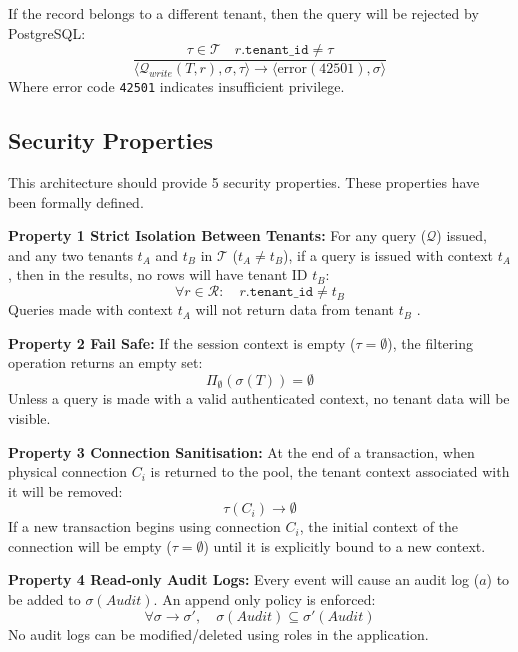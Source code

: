 \documentclass[conference]{IEEEtran}
\begin{document}
If the record belongs to a different tenant, then the query will be rejected by PostgreSQL:
\begin{equation}
\frac{\tau \in \mathcal{T} \quad r.\texttt{tenant\_id} \neq \tau}{\langle \mathcal{Q}_{\mathit{write}}(T, r), \sigma, \tau \rangle \to \langle \text{error}(42501), \sigma \rangle}
\end{equation}
Where error code \texttt{42501} indicates insufficient privilege.

\subsection{Security Properties}
This architecture should provide 5 security properties. These properties have been formally defined.

\noindent \textbf{Property 1 Strict Isolation Between Tenants:} For any query ($\mathcal{Q}$) issued, and any two tenants $t_A$ and $t_B$ in $\mathcal{T}$ ($t_A \neq t_B$), if a query is issued with context $t_A$, then in the results, no rows will have tenant ID $t_B$:
\begin{equation}
\forall r \in \mathcal{R}: \quad r.\texttt{tenant\_id} \neq t_B
\end{equation}
Queries made with context $t_A$ will not return data from tenant $t_B$ \cite{goguen1982}.

\noindent \textbf{Property 2 Fail Safe:} If the session context is empty ($\tau = \emptyset$), the filtering operation returns an empty set:
\begin{equation}
\Pi_\emptyset(\sigma(T)) = \emptyset
\end{equation}
Unless a query is made with a valid authenticated context, no tenant data will be visible.

\noindent \textbf{Property 3 Connection Sanitisation:} At the end of a transaction, when physical connection $C_i$ is returned to the pool, the tenant context associated with it will be removed:
\begin{equation}
\tau(C_i) \to \emptyset
\end{equation}
If a new transaction begins using connection $C_i$, the initial context of the connection will be empty ($\tau = \emptyset$) until it is explicitly bound to a new context.

\noindent \textbf{Property 4 Read-only Audit Logs:} Every event will cause an audit log ($a$) to be added to $\sigma(\mathit{Audit})$. An append only policy is enforced:
\begin{equation}
\forall \sigma \to \sigma', \quad \sigma(\mathit{Audit}) \subseteq \sigma'(\mathit{Audit})
\end{equation}
No audit logs can be modified/deleted using roles in the application.
\end{document}
